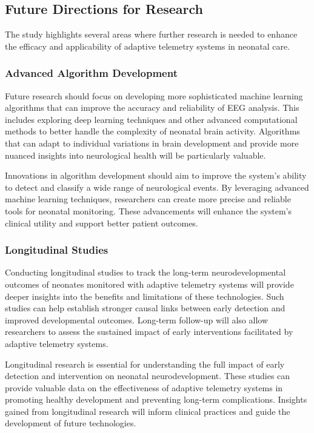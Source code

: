 \documentclass[12pt,journal,compsoc]{IEEEtran}
\begin{document}
\subsection{Future Directions for Research}

The study highlights several areas where further research is needed to enhance the efficacy and applicability of adaptive telemetry systems in neonatal care.

\subsubsection{Advanced Algorithm Development}

Future research should focus on developing more sophisticated machine learning algorithms that can improve the accuracy and reliability of EEG analysis. This includes exploring deep learning techniques and other advanced computational methods to better handle the complexity of neonatal brain activity. Algorithms that can adapt to individual variations in brain development and provide more nuanced insights into neurological health will be particularly valuable.

Innovations in algorithm development should aim to improve the system's ability to detect and classify a wide range of neurological events. By leveraging advanced machine learning techniques, researchers can create more precise and reliable tools for neonatal monitoring. These advancements will enhance the system's clinical utility and support better patient outcomes.

\subsubsection{Longitudinal Studies}

Conducting longitudinal studies to track the long-term neurodevelopmental outcomes of neonates monitored with adaptive telemetry systems will provide deeper insights into the benefits and limitations of these technologies. Such studies can help establish stronger causal links between early detection and improved developmental outcomes. Long-term follow-up will also allow researchers to assess the sustained impact of early interventions facilitated by adaptive telemetry systems.

Longitudinal research is essential for understanding the full impact of early detection and intervention on neonatal neurodevelopment. These studies can provide valuable data on the effectiveness of adaptive telemetry systems in promoting healthy development and preventing long-term complications. Insights gained from longitudinal research will inform clinical practices and guide the development of future technologies.
\end{document}
